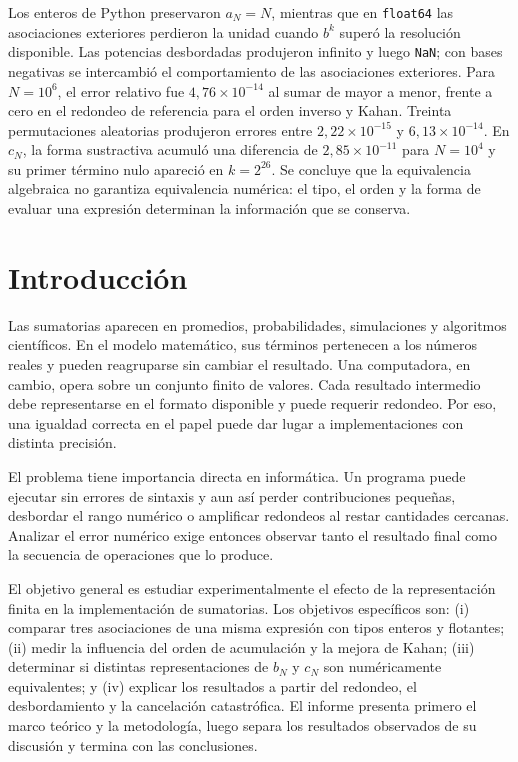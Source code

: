 \documentclass[11pt,a4paper]{article}
\newcommand{\codigo}[1]{\texttt{#1}}
\begin{document}
Los enteros de Python preservaron $a_N=N$, mientras que en \codigo{float64} las asociaciones exteriores perdieron la unidad cuando $b^k$ superó la resolución disponible. Las potencias desbordadas produjeron infinito y luego \codigo{NaN}; con bases negativas se intercambió el comportamiento de las asociaciones exteriores. Para $N=10^6$, el error relativo fue $4{,}76\times10^{-14}$ al sumar de mayor a menor, frente a cero en el redondeo de referencia para el orden inverso y Kahan. Treinta permutaciones aleatorias produjeron errores entre $2{,}22\times10^{-15}$ y $6{,}13\times10^{-14}$. En $c_N$, la forma sustractiva acumuló una diferencia de $2{,}85\times10^{-11}$ para $N=10^4$ y su primer término nulo apareció en $k=2^{26}$. Se concluye que la equivalencia algebraica no garantiza equivalencia numérica: el tipo, el orden y la forma de evaluar una expresión determinan la información que se conserva.

\clearpage
\tableofcontents
\clearpage
{}

\section{Introducción}

Las sumatorias aparecen en promedios, probabilidades, simulaciones y algoritmos científicos. En el modelo matemático, sus términos pertenecen a los números reales y pueden reagruparse sin cambiar el resultado. Una computadora, en cambio, opera sobre un conjunto finito de valores. Cada resultado intermedio debe representarse en el formato disponible y puede requerir redondeo. Por eso, una igualdad correcta en el papel puede dar lugar a implementaciones con distinta precisión.

El problema tiene importancia directa en informática. Un programa puede ejecutar sin errores de sintaxis y aun así perder contribuciones pequeñas, desbordar el rango numérico o amplificar redondeos al restar cantidades cercanas. Analizar el error numérico exige entonces observar tanto el resultado final como la secuencia de operaciones que lo produce.

El objetivo general es estudiar experimentalmente el efecto de la representación finita en la implementación de sumatorias. Los objetivos específicos son: (i) comparar tres asociaciones de una misma expresión con tipos enteros y flotantes; (ii) medir la influencia del orden de acumulación y la mejora de Kahan; (iii) determinar si distintas representaciones de $b_N$ y $c_N$ son numéricamente equivalentes; y (iv) explicar los resultados a partir del redondeo, el desbordamiento y la cancelación catastrófica. El informe presenta primero el marco teórico y la metodología, luego separa los resultados observados de su discusión y termina con las conclusiones.
\end{document}
